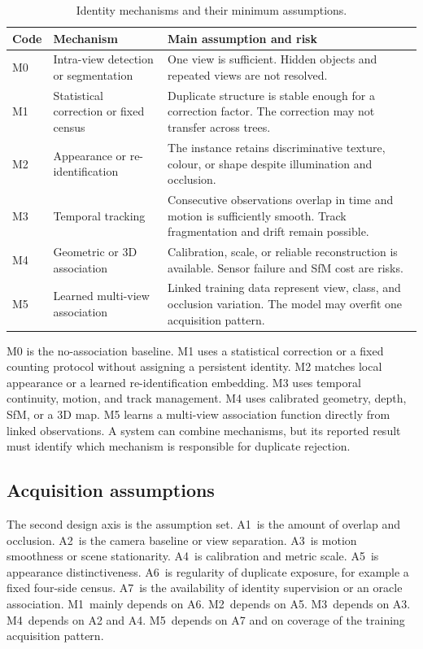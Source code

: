 \begin{table}[t]
\centering
\caption{Identity mechanisms and their minimum assumptions.}
\label{tab:mechanisms}
\small
\begin{tabularx}{\columnwidth}{@{}lY Y@{}}
\toprule
Code & Mechanism & Main assumption and risk\\
\midrule
M0 & Intra-view detection or segmentation & One view is sufficient. Hidden objects and repeated views are not resolved.\\
M1 & Statistical correction or fixed census & Duplicate structure is stable enough for a correction factor. The correction may not transfer across trees.\\
M2 & Appearance or re-identification & The instance retains discriminative texture, colour, or shape despite illumination and occlusion.\\
M3 & Temporal tracking & Consecutive observations overlap in time and motion is sufficiently smooth. Track fragmentation and drift remain possible.\\
M4 & Geometric or 3D association & Calibration, scale, or reliable reconstruction is available. Sensor failure and SfM cost are risks.\\
M5 & Learned multi-view association & Linked training data represent view, class, and occlusion variation. The model may overfit one acquisition pattern.\\
\bottomrule
\end{tabularx}
\end{table}

M0 is the no-association baseline. M1 uses a statistical correction or a fixed counting protocol without assigning a persistent identity. M2 matches local appearance or a learned re-identification embedding. M3 uses temporal continuity, motion, and track management. M4 uses calibrated geometry, depth, SfM, or a 3D map. M5 learns a multi-view association function directly from linked observations. A system can combine mechanisms, but its reported result must identify which mechanism is responsible for duplicate rejection.

\subsection{Acquisition assumptions}

The second design axis is the assumption set. A1~is the amount of overlap and occlusion. A2~is the camera baseline or view separation. A3~is motion smoothness or scene stationarity. A4~is calibration and metric scale. A5~is appearance distinctiveness. A6~is regularity of duplicate exposure, for example a fixed four-side census. A7~is the availability of identity supervision or an oracle association. M1~mainly depends on A6. M2~depends on A5. M3~depends on A3. M4~depends on A2 and A4. M5~depends on A7 and on coverage of the training acquisition pattern.

